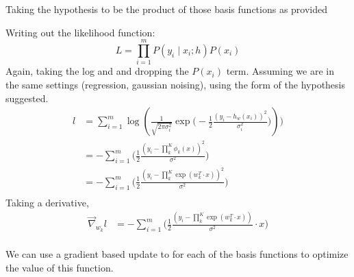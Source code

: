 \documentclass[12pt]{article}
\newenvironment{problem}[2][Problem]{\begin{trivlist}
\item[\hskip \labelsep {\bfseries #1}\hskip \labelsep {\bfseries #2.}]}{\end{trivlist}}
\begin{document}
\begin{problem}{4.}
Taking the hypothesis to be the product of those basis functions as provided
\end{problem}
Writing out the likelihood function:
\[
    L = \prod_{i=1}^{m} P(y_i \mid x_i ; h ) P(x_i)
\]
Again, taking the log and and dropping the $P(x_i)$ term. Assuming we are in the same settings
(regression, gaussian noising), using the form of the hypothesis suggested.
\begin{align*}
    l &= \sum_{i=1}^{m} \log ( \frac{1}{\sqrt{2\pi\sigma_i^2}} \exp \Big(-\frac{1}{2} \frac{(y_i - h_w(x_i))^2}{\sigma_i^2} \Big))) \\
      &= -\sum_{i=1}^{m} \Big(\frac{1}{2} \frac{(y_i - \prod_k^K \phi_k(x) )^2}{\sigma^2} \Big) \\
      &= -\sum_{i=1}^{m} \Big(\frac{1}{2} \frac{(y_i - \prod_k^K \exp(w_k^T \cdot x) )^2}{\sigma^2} \Big)\\
\end{align*}
Taking a derivative, 
\begin{align*}
    \vec\nabla_{w_k} l  &= -\sum_{i=1}^{m} \Big(\frac{1}{2} \frac{(y_i - \prod_k^K \exp(w_k^T \cdot x))}{\sigma^2} \cdot x  \Big)\\ 
\end{align*}

We can use a gradient based update to for each of the basis functions to optimize the value of this function.

\end{document}
